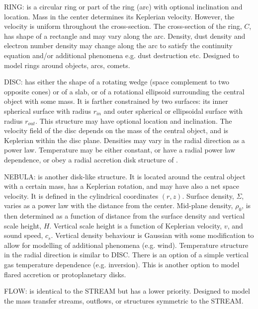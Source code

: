 \documentclass[11pt,twoside]{article}
\begin{document}
RING:
is a circular ring or part of the ring (arc) with optional inclination 
and location. Mass in the center determines its Keplerian velocity. 
However, the velocity is uniform throughout the cross-section. 
The cross-section of the ring, $C$, has shape of 
a rectangle and may vary along the arc. Density, dust density and 
electron number density may change along the arc 
to satisfy the continuity equation and/or additional phenomena
e.g. dust destruction etc.
Designed to model rings around objects, arcs, comets.

DISC:
has either the shape of a rotating wedge 
(space complement to two opposite cones)
or of a slab, or of a rotational ellipsoid surrounding 
the central object with some mass.
It is farther constrained by two surfaces: its inner spherical
surface with radius $r_{in}$ and outer spherical or ellipsoidal surface
with radius $r_{out}$. This structure may have optional location
and inclination.
The velocity field of the disc depends on the mass of the central 
object, and is Keplerian within the disc plane.
Densities may vary in the radial direction as a power law.
Temperature may be either constant, or have a radial power law 
dependence, or obey a radial accretion disk structure of 
\cite{pringle81}.

NEBULA:
is another disk-like structure. It is located around the central object
with a certain mass,
has a Keplerian rotation, and may have also a net space velocity. 
It is defined in the cylindrical coordinates $(r,z)$.
Surface density, $\Sigma$, varies as a power law with the distance 
from the center.
Mid-plane density, $\rho_{0}$, is then determined as a function of 
distance from the surface density and vertical scale height, $H$.
Vertical scale height is a function of Keplerian velocity, $v$, and 
sound speed, $c_{s}$.
Vertical density behaviour is Gaussian with some modification
to allow for modelling of additional phenomena (e.g. wind).
Temperature structure in the radial direction is similar to DISC.
There is an option of a simple vertical gas temperature dependence
(e.g. inversion).
This is another option to model flared accretion or protoplanetary 
disks.

FLOW:
is identical to the STREAM but has a lower priority.
Designed to model the mass transfer streams, outflows,
or structures symmetric to the STREAM.
\end{document}
